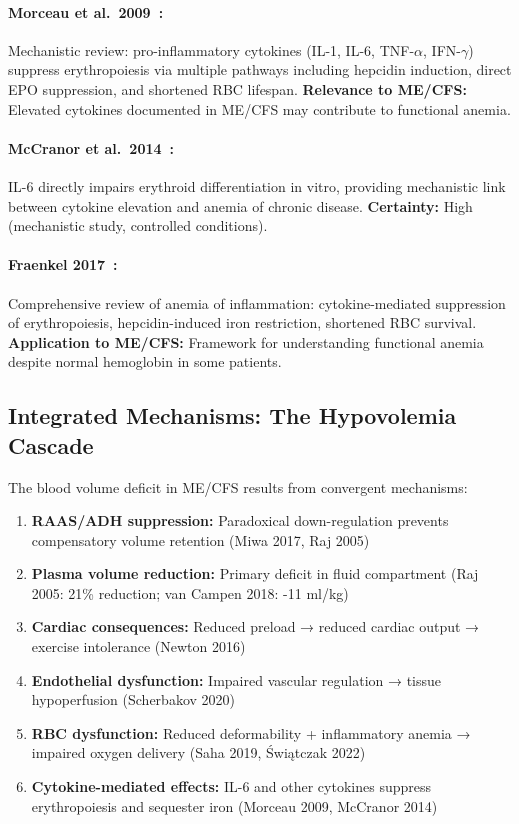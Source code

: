 \paragraph{Morceau et al.\ 2009~\cite{Morceau2010}:}
Mechanistic review: pro-inflammatory cytokines (IL-1, IL-6, TNF-$\alpha$, IFN-$\gamma$) suppress erythropoiesis via multiple pathways including hepcidin induction, direct EPO suppression, and shortened RBC lifespan. \textbf{Relevance to ME/CFS:} Elevated cytokines documented in ME/CFS may contribute to functional anemia.

\paragraph{McCranor et al.\ 2014~\cite{McCranor2014}:}
IL-6 directly impairs erythroid differentiation in vitro, providing mechanistic link between cytokine elevation and anemia of chronic disease. \textbf{Certainty:} High (mechanistic study, controlled conditions).

\paragraph{Fraenkel 2017~\cite{Fraenkel2017}:}
Comprehensive review of anemia of inflammation: cytokine-mediated suppression of erythropoiesis, hepcidin-induced iron restriction, shortened RBC survival. \textbf{Application to ME/CFS:} Framework for understanding functional anemia despite normal hemoglobin in some patients.

\subsection{Integrated Mechanisms: The Hypovolemia Cascade}

The blood volume deficit in ME/CFS results from convergent mechanisms:

\begin{enumerate}
    \item \textbf{RAAS/ADH suppression:} Paradoxical down-regulation prevents compensatory volume retention (Miwa 2017, Raj 2005)
    \item \textbf{Plasma volume reduction:} Primary deficit in fluid compartment (Raj 2005: 21\% reduction; van Campen 2018: -11 ml/kg)
    \item \textbf{Cardiac consequences:} Reduced preload → reduced cardiac output → exercise intolerance (Newton 2016)
    \item \textbf{Endothelial dysfunction:} Impaired vascular regulation → tissue hypoperfusion (Scherbakov 2020)
    \item \textbf{RBC dysfunction:} Reduced deformability + inflammatory anemia → impaired oxygen delivery (Saha 2019, Świątczak 2022)
    \item \textbf{Cytokine-mediated effects:} IL-6 and other cytokines suppress erythropoiesis and sequester iron (Morceau 2009, McCranor 2014)
\end{enumerate}

